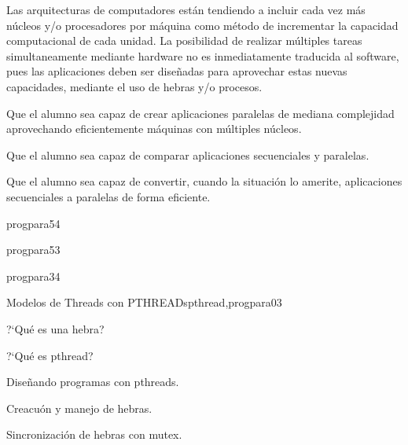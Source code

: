 \begin{syllabus}


\begin{justification}
Las arquitecturas de computadores están tendiendo a incluir cada vez más núcleos 
y/o procesadores por máquina como método de incrementar la capacidad computacional
de cada unidad. La posibilidad de realizar múltiples tareas simultaneamente mediante hardware 
no es inmediatamente traducida al software, pues las aplicaciones deben 
ser diseñadas para aprovechar estas nuevas capacidades, mediante el uso de hebras y/o procesos.
\end{justification}

\begin{goals}
\item Que el alumno sea capaz de crear aplicaciones paralelas de mediana complejidad aprovechando eficientemente máquinas con múltiples núcleos.
\item Que el alumno sea capaz de comparar aplicaciones secuenciales y paralelas.
\item Que el alumno sea capaz de convertir, cuando la situación lo amerite, aplicaciones secuenciales a paralelas de forma eficiente.
\end{goals}

\begin{outcomes}
\end{outcomes}

\begin{unit}{\CNParallelComputationDef}{progpara}{5}{4}
      \CNParallelComputationAllTopics %
      \CNParallelComputationAllObjectives
\end{unit}

\begin{unit}{\ARMultiprocessingDef}{progpara}{5}{3}
      \ARMultiprocessingAllTopics
      \ARMultiprocessingAllObjectives
\end{unit}

\begin{unit}{\ALParallelAlgorithmsDef}{progpara}{3}{4}
      \ALParallelAlgorithmsAllTopics %
      \ALParallelAlgorithmsAllObjectives
\end{unit}

\begin{unit}{Modelos de Threads con PTHREADs}{pthread,progpara}{0}{3}
\begin{topics}
         \item ?`Qué es una hebra?
         \item ?`Qué es  pthread?
         \item Diseñando programas con pthreads.
         \item Creacuón y manejo de hebras.
         \item Sincronización de hebras con mutex.
\end{topics}


\end{unit}
\end{syllabus}
